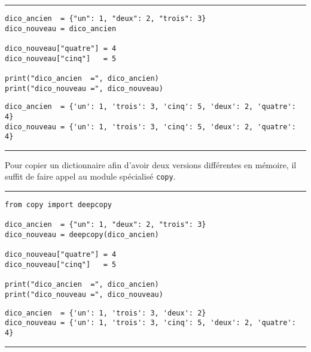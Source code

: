 \bigskip
{\hrule height .5mm}
\begin{verbatim}
dico_ancien  = {"un": 1, "deux": 2, "trois": 3}
dico_nouveau = dico_ancien

dico_nouveau["quatre"] = 4
dico_nouveau["cinq"]   = 5

print("dico_ancien  =", dico_ancien)
print("dico_nouveau =", dico_nouveau)
\end{verbatim}
 \color{ForestGreen}
\vspace{-1.5em}
\begin{verbatim}
dico_ancien  = {'un': 1, 'trois': 3, 'cinq': 5, 'deux': 2, 'quatre': 4}
dico_nouveau = {'un': 1, 'trois': 3, 'cinq': 5, 'deux': 2, 'quatre': 4}
\end{verbatim} \color{Black}
{\hrule height .5mm}
\bigskip


Pour copier un dictionnaire afin d'avoir deux versions différentes en mémoire, il suffit de faire appel au module spécialisé \texttt{copy}.


\bigskip
{\hrule height .5mm}
\begin{verbatim}
from copy import deepcopy

dico_ancien  = {"un": 1, "deux": 2, "trois": 3}
dico_nouveau = deepcopy(dico_ancien)

dico_nouveau["quatre"] = 4
dico_nouveau["cinq"]   = 5

print("dico_ancien  =", dico_ancien)
print("dico_nouveau =", dico_nouveau)
\end{verbatim}
 \color{ForestGreen}
\vspace{-1.5em}
\begin{verbatim}
dico_ancien  = {'un': 1, 'trois': 3, 'deux': 2}
dico_nouveau = {'un': 1, 'trois': 3, 'cinq': 5, 'deux': 2, 'quatre': 4}
\end{verbatim} \color{Black}
{\hrule height .5mm}
\bigskip